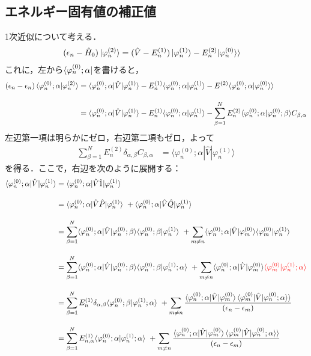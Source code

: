 \subsection{エネルギー固有値の補正値}
1次近似について考える．
\begin{align}
(\epsilon_n-\hat{H}_0)\ket{\varphi^{(2)}_n}
&=(\hat{V}-E^{(1)}_n)\ket{\varphi^{(1)}_n}-E^{(2)}_n|\varphi^{(0)}_n\rangle\rangle
\end{align}
これに，左から$\bra{\varphi^{(0)}_n;\alpha}$を書けると，
\begin{align}\label{pereq2-1_degenerate}
(\epsilon_n-\epsilon_n)\braket{\varphi^{(0)}_n;\alpha|\varphi^{(2)}_n}
&=\langle{\varphi^{(0)}_n;\alpha|\hat{V}|\varphi^{(1)}_n}\rangle
-E^{(1)}_n\langle{\varphi^{(0)}_n;\alpha|\varphi^{(1)}_n}\rangle
-E^{(2)}\langle{\varphi^{(0)}_n;\alpha|\varphi^{(0)}_n}\rangle\rangle\\[10pt]
%
&=\langle{\varphi^{(0)}_n;\alpha|\hat{V}|\varphi^{(1)}_n}\rangle
-E^{(1)}_n\langle{\varphi^{(0)}_n;\alpha|\varphi^{(1)}_n}\rangle
-\sum_{\beta=1}^{N}E^{(2)}_n
\langle \varphi^{(0)}_n;\alpha|\varphi^{(0)}_n;\beta\rangle C_{\beta,\alpha}
\end{align}
左辺第一項は明らかにゼロ，右辺第二項もゼロ，よって
\begin{align}\label{2ndpertubation_matrix}
\sum_{\beta=1}^{N}E^{(2)}_n
\delta_{\alpha,\beta}C_{\beta,\alpha}&=
\langle{\varphi^{(0)}_n;\alpha|\hat{V}|\varphi^{(1)}_n}\rangle
\end{align}
を得る．ここで，右辺を次のように展開する：
\begin{align}
    \langle{\varphi^{(0)}_n;\alpha|\hat{V}|\varphi^{(1)}_n}\rangle
    &=\langle{\varphi^{(0)}_n;\alpha|\hat{V}\hat{1}|\varphi^{(1)}_n}\rangle\nn[10pt]
    &=\langle{\varphi^{(0)}_n;\alpha|\hat{V}\hat{P}|\varphi^{(1)}_n}\rangle\
    + \langle{\varphi^{(0)}_n;\alpha|\hat{V}\hat{Q}|\varphi^{(1)}_n}\rangle\nn[10pt]
    &=\sum_{\beta=1}^{N}\langle{\varphi^{(0)}_n;\alpha|\hat{V}|\varphi^{(0)}_n;\beta}\rangle
    \langle{\varphi^{(0)}_n;\beta|\varphi^{(1)}_n}\rangle\
    +\sum_{m\neq n}\langle{\varphi^{(0)}_n;\alpha|\hat{V}|\varphi^{(0)}_m}\rangle
    \langle{\varphi^{(0)}_m|\varphi^{(1)}_n}\rangle\nn[10pt]
    &=\sum_{\beta=1}^{N}\langle{\varphi^{(0)}_n;\alpha|\hat{V}|\varphi^{(0)}_n;\beta}\rangle
    \langle{\varphi^{(0)}_n;\beta|\varphi^{(1)}_n;\alpha}\rangle\
    +\sum_{m\neq n}\langle{\varphi^{(0)}_n;\alpha|\hat{V}|\varphi^{(0)}_m}\rangle
    \textcolor{red}{\langle{\varphi^{(0)}_m|\varphi^{(1)}_n;\alpha}\rangle}\nn[10pt]
    &=\sum_{\beta=1}^{N}E^{(1)}_{n}\delta_{\alpha,\beta}
    \langle{\varphi^{(0)}_n;\beta|\varphi^{(1)}_n;\alpha}\rangle\
    +\sum_{m\neq n}
    \frac{\langle{\varphi^{(0)}_n;\alpha|\hat{V}|\varphi^{(0)}_m}\rangle
    \braket{\varphi^{(0)}_{m}|\hat{V}|\varphi^{(0)}_n;\alpha}\rangle}{(\epsilon_n-\epsilon_m)}\nn[10pt]
    &=\sum_{\beta=1}^{N}E^{(1)}_{n,\alpha}
    \langle{\varphi^{(0)}_n;\alpha|\varphi^{(1)}_n;\alpha}\rangle\
    +\sum_{m\neq n}
    \frac{\langle{\varphi^{(0)}_n;\alpha|\hat{V}|\varphi^{(0)}_m}\rangle
    \braket{\varphi^{(0)}_{m}|\hat{V}|\varphi^{(0)}_n;\alpha}\rangle}{(\epsilon_n-\epsilon_m)}
\end{align}
